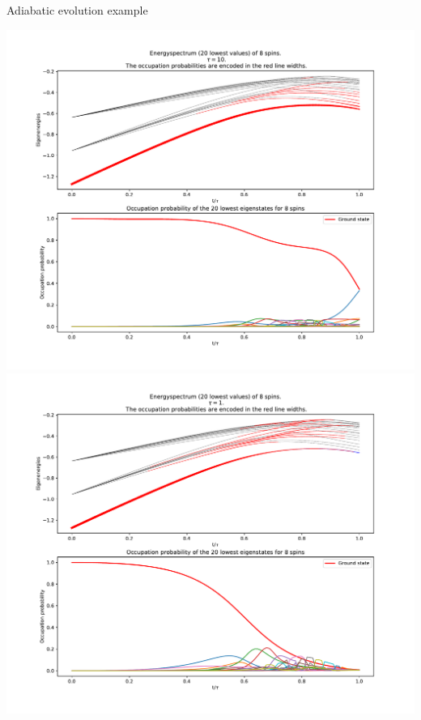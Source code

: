\begin{frame}[allowframebreaks]{Adiabatic evolution example}
\begin{center}
    \includegraphics[height=0.75\textheight]{pics/adiabatic/adiabatic_10.pdf}\\
    \includegraphics[height=0.75\textheight]{pics/adiabatic/adiabatic_1.pdf}
\end{center}
\end{frame}
\begingroup
\nologo
